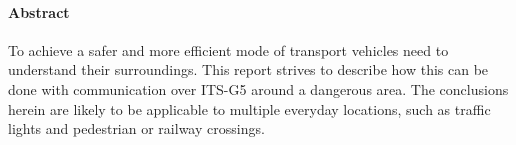 \paragraph{Abstract}
To achieve a safer and more efficient mode of transport vehicles need to understand their surroundings. This report strives to describe how this can be done with communication over ITS-G5 around a dangerous area. The conclusions herein are likely to be applicable to multiple everyday locations, such as traffic lights and pedestrian or railway crossings.
